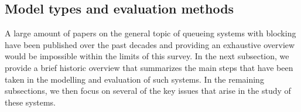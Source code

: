 \documentclass[twoside]{article}
\begin{document}
\begin{multicols}{2}
\section{\textbf{Model types and evaluation methods}}
A large amount of papers on the general topic of queueing systems with blocking have been published over the past decades and providing an exhaustive overview would be impossible within the limits of this survey. In the next subsection, we provide a brief historic overview that summarizes the main steps that have been taken in the modelling and evaluation of such systems. In the remaining subsections, we then focus on several of the key issues that arise in the study of these systems.
\label{sec:relevantwork}

\end{multicols}
\end{document}
